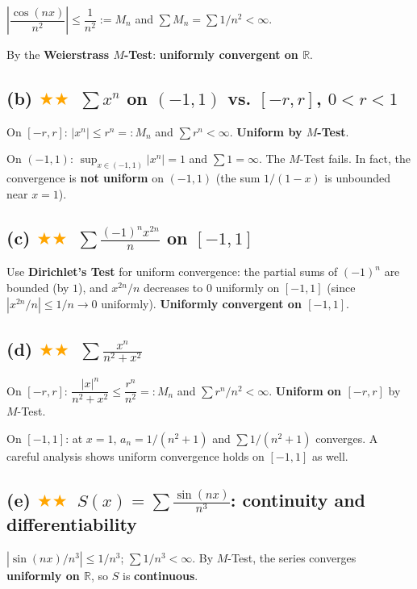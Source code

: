 \documentclass[12pt,a4paper]{article}
\newcommand{\medium}{\textcolor{orange}{$\bigstar\bigstar$}}
\begin{document}
$\left|\dfrac{\cos(nx)}{n^2}\right|\leq\dfrac{1}{n^2}:=M_n$ and $\sum M_n=\sum1/n^2<\infty$.

By the \textbf{Weierstrass $M$-Test}: \textbf{uniformly convergent on $\mathbb{R}$}.

\subsection*{(b) \medium\ $\displaystyle\sum x^n$ on $(-1,1)$ vs. $[-r,r]$, $0<r<1$}

On $[-r,r]$: $|x^n|\leq r^n=:M_n$ and $\sum r^n<\infty$.  \textbf{Uniform by $M$-Test}.

On $(-1,1)$: $\sup_{x\in(-1,1)}|x^n|=1$ and $\sum 1=\infty$.  The $M$-Test fails. In fact, the convergence is \textbf{not uniform} on $(-1,1)$ (the sum $1/(1-x)$ is unbounded near $x=1$).

\subsection*{(c) \medium\ $\displaystyle\sum\frac{(-1)^n x^{2n}}{n}$ on $[-1,1]$}

Use \textbf{Dirichlet's Test} for uniform convergence: the partial sums of $(-1)^n$ are bounded (by $1$), and $x^{2n}/n$ decreases to $0$ uniformly on $[-1,1]$ (since $|x^{2n}/n|\leq 1/n\to 0$ uniformly).  \textbf{Uniformly convergent on $[-1,1]$}.

\subsection*{(d) \medium\ $\displaystyle\sum\frac{x^n}{n^2+x^2}$}

On $[-r,r]$: $\dfrac{|x|^n}{n^2+x^2}\leq\dfrac{r^n}{n^2}=:M_n$ and $\sum r^n/n^2<\infty$.  \textbf{Uniform on $[-r,r]$} by $M$-Test.

On $[-1,1]$: at $x=1$, $a_n=1/(n^2+1)$ and $\sum 1/(n^2+1)$ converges.  A careful analysis shows uniform convergence holds on $[-1,1]$ as well.

\subsection*{(e) \medium\ $S(x)=\displaystyle\sum\frac{\sin(nx)}{n^3}$: continuity and differentiability}

$|\sin(nx)/n^3|\leq 1/n^3$; $\sum 1/n^3<\infty$.  By $M$-Test, the series converges \textbf{uniformly on $\mathbb{R}$}, so $S$ is \textbf{continuous}.
\end{document}
